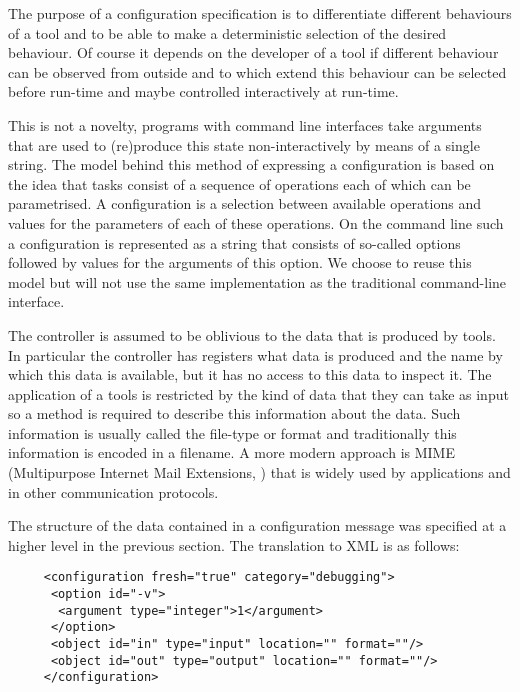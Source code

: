 \documentclass{article}
\begin{document}
   The purpose of a configuration specification is to differentiate different
   behaviours of a tool and to be able to make a deterministic selection of the
   desired behaviour. Of course it depends on the developer of a tool if
   different behaviour can be observed from outside and to which extend this
   behaviour can be selected before run-time and maybe controlled interactively
   at run-time.

   This is not a novelty, programs with command line interfaces take arguments
   that are used to (re)produce this state non-interactively by means of a
   single string. The model behind this method of expressing a configuration is
   based on the idea that tasks consist of a sequence of operations each of
   which can be parametrised. A configuration is a selection between available
   operations and values for the parameters of each of these operations. On the
   command line such a configuration is represented as a string that consists
   of so-called options followed by values for the arguments of this option. We
   choose to reuse this model but will not use the same implementation as the
   traditional command-line interface.

   The controller is assumed to be oblivious to the data that is produced by
   tools. In particular the controller has registers what data is produced and
   the name by which this data is available, but it has no access to this data
   to inspect it. The application of a tools is restricted by the kind of data
   that they can take as input so a method is required to describe this
   information about the data. Such information is usually called the file-type
   or format and traditionally this information is encoded in a filename. A
   more modern approach is MIME (Multipurpose Internet Mail Extensions, \cite{rfc2822})
   that is widely used by applications and in other communication protocols.

   The structure of the data contained in a configuration message was specified
   at a higher level in the previous section. The translation to XML is as
   follows:

    \begin{verbatim}
     <configuration fresh="true" category="debugging">
      <option id="-v">
       <argument type="integer">1</argument>
      </option>
      <object id="in" type="input" location="" format=""/>
      <object id="out" type="output" location="" format=""/>
     </configuration>\end{verbatim}
\end{document}
